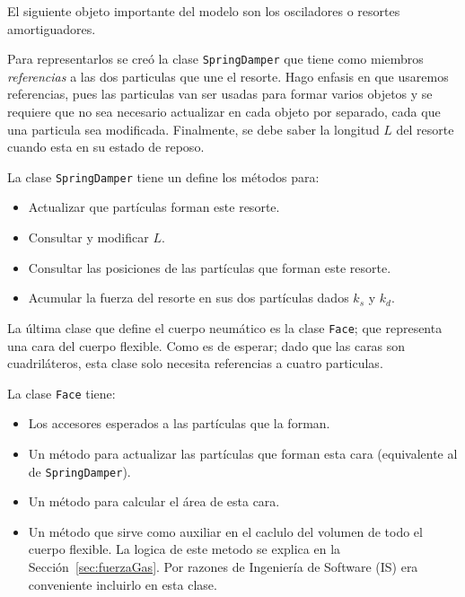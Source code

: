 {\centering
\begin{minipage}{\linewidth}
\end{minipage}
\par
}

El siguiente objeto importante del modelo son los osciladores o resortes amortiguadores.

Para representarlos se creó la clase \texttt{SpringDamper} que tiene como miembros \emph{referencias} a las dos particulas que une el resorte.
Hago enfasis en que usaremos referencias, pues las particulas van ser usadas para formar varios objetos y se requiere que no sea necesario actualizar en cada objeto por separado, cada que una particula sea modificada. Finalmente, se debe saber la longitud $L$ del resorte cuando esta en su estado de reposo.

La clase \texttt{SpringDamper} tiene un define los métodos para:
\begin{itemize}
 \item Actualizar que partículas forman este resorte.
 \item Consultar y modificar $L$.
 \item Consultar las posiciones de las partículas que forman este resorte.
 \item Acumular la fuerza del resorte en sus dos partículas dados $k_s$ y $k_d$.
\end{itemize}

La última clase que define el cuerpo neumático es la clase \texttt{Face}; que representa una cara del cuerpo flexible.
Como es de esperar; dado que las caras son cuadriláteros, esta clase solo necesita referencias a cuatro particulas.

La clase \texttt{Face} tiene:
\begin{itemize}
 \item Los accesores esperados a las partículas que la forman.
 \item Un método para actualizar las partículas que forman esta cara (equivalente al de \texttt{SpringDamper}).
 \item Un método para calcular el área de esta cara.
 \item Un método que sirve como auxiliar en el caclulo del volumen de todo el cuerpo flexible. La logica de este metodo se explica en la Sección~\ref{sec:fuerzaGas}. Por razones de Ingeniería de Software (IS) era conveniente incluirlo en esta clase.
\end{itemize}

